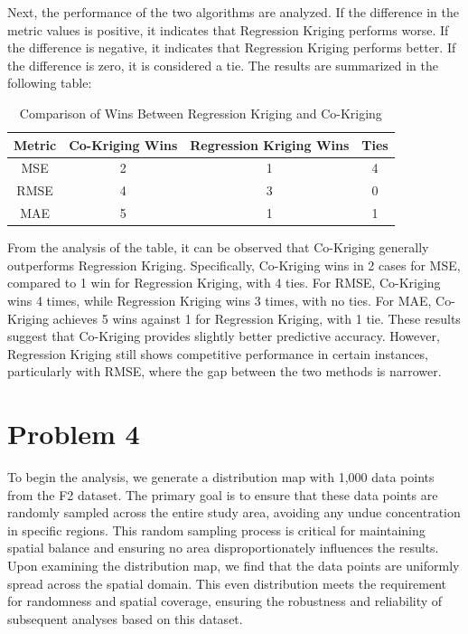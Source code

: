 \documentclass{swmcmthesis}
\begin{document}
Next, the performance of the two algorithms are analyzed. If the difference in the metric values is positive, it indicates that Regression Kriging performs worse. If the difference is negative, it indicates that Regression Kriging performs better. If the difference is zero, it is considered a tie. The results are summarized in the following table:

\begin{table}[h!]
\centering
\caption{Comparison of Wins Between Regression Kriging and Co-Kriging}
\begin{tabular}{|c|c|c|c|}
\hline
\textbf{Metric} & \textbf{Co-Kriging Wins} & \textbf{Regression Kriging Wins} & \textbf{Ties} \\\hline
MSE             & 2                                & 1                        & 4            \\\hline
RMSE            & 4                               & 3                        & 0            \\\hline
MAE             & 5                                & 1                        & 1            \\\hline
\end{tabular}
\end{table}

From the analysis of the table, it can be observed that Co-Kriging generally outperforms Regression Kriging. Specifically, Co-Kriging wins in 2 cases for MSE, compared to 1 win for Regression Kriging, with 4 ties. For RMSE, Co-Kriging wins 4 times, while Regression Kriging wins 3 times, with no ties. For MAE, Co-Kriging achieves 5 wins against 1 for Regression Kriging, with 1 tie. These results suggest that Co-Kriging provides slightly better predictive accuracy. However, Regression Kriging still shows competitive performance in certain instances, particularly with RMSE, where the gap between the two methods is narrower.


\section{Problem 4}

To begin the analysis, we generate a distribution map with 1,000 data points from the F2 dataset. The primary goal is to ensure that these data points are randomly sampled across the entire study area, avoiding any undue concentration in specific regions. This random sampling process is critical for maintaining spatial balance and ensuring no area disproportionately influences the results. Upon examining the distribution map, we find that the data points are uniformly spread across the spatial domain. This even distribution meets the requirement for randomness and spatial coverage, ensuring the robustness and reliability of subsequent analyses based on this dataset.
\end{document}
